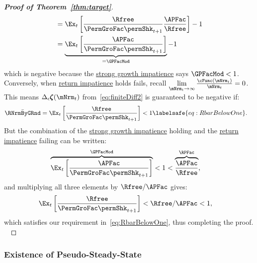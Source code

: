 \documentclass[\econtexRoot/BufferStockTheory]{subfiles}
\begin{document}
\begin{proof}[\textbf{Proof of Theorem~\ref{thm:target}}]
\begin{align*}
                                                            & = \Ex_{t}\left[\frac{\Rfree}{\PermGroFac \permShk_{t+1}}\frac{\APFac}{\Rfree}\right] - 1 \\
                                                            & = \underbrace{\Ex_{t}\left[\frac{\APFac}{\PermGroFac \permShk_{t+1}}\right]}_{= \GPFacMod} - 1 
\end{align*}
%
which is negative because the \hyperlink{GICMod}{strong growth impatience} says $\GPFacMod < 1$.
Conversely, when \hyperlink{RIC}{return impatience} holds fails, recall $\lim\limits_{\mNrm_{t} \rightarrow \infty} \frac{\cFunc(\mNrm_{t})}{\mNrm_{t}} = 0$.
This means $ \Delta_{\epsilon}\difFunc(\mNrm_{t})$ from~\eqref{eq:finiteDiff2} is guaranteed to be negative if:
%
\begin{align}
  \bar{\RNrmByGRnd} = \Ex_{t}\left[\frac{\Rfree}{\PermGroFac \permShk_{t+1}}\right] & < 1  \labelsafe{eq:RbarBelowOne}.
\end{align}
%
But the combination of the \hyperlink{GICMod}{strong growth impatience} holding and the \hyperlink{RIC}{return impatience} failing can be written:
%
\begin{align}\label{eq:GICStrRICfailst1}
  \overbrace{\Ex_{t}\left[\frac{\APFac}{\PermGroFac \permShk_{t+1}}\right]}^{\GPFacMod} & < 1 < \overbrace{\frac{\APFac}{\Rfree}}^{{\RPFac}},
\end{align}
%
and multiplying all three elements by $\Rfree/\APFac$ gives:
%
\begin{align}\label{eq:GICStrRICfailst2}
  \Ex_{t}\left[\frac{\Rfree}{\PermGroFac \permShk_{t+1}}\right] & < \Rfree/\APFac < 1,
\end{align}
%
which satisfies our requirement in~\eqref{eq:RbarBelowOne}, thus completing the proof.
\


\end{proof}
  
\subsubsection{Existence of Pseudo-Steady-State}\label{subsubsec:AppxPseudoSS}
\end{document}
